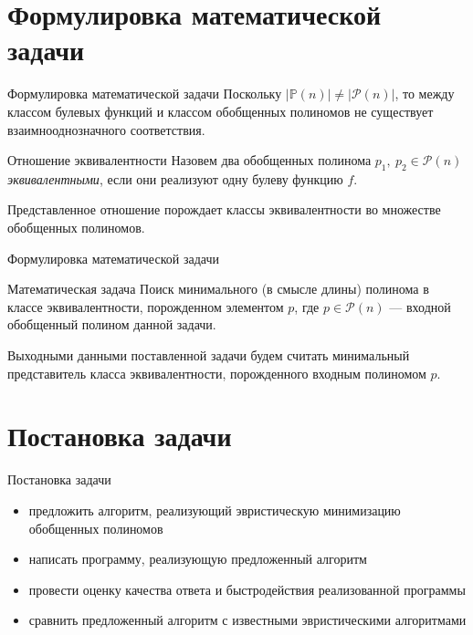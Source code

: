 \documentclass{beamer}
\begin{document}
\section[Математическая задача]{Формулировка математической задачи}
\begin{frame}{Формулировка математической задачи}
Поскольку $ \left| \mathbb{P}(n) \right| \ne \left| \mathcal{P}(n) \right| $, то между классом булевых функций и классом обобщенных полиномов не существует взаимнооднозначного соответствия.

\begin{block}{Отношение эквивалентности}
Назовем два обобщенных полинома $ p_1,\ p_2 \in \mathcal{P}(n) $ \textit{эквивалентными}, если они реализуют одну булеву функцию $ f $.
\end{block}

Представленное отношение порождает классы эквивалентности во множестве обобщенных полиномов.

\end{frame}
\begin{frame}{Формулировка математической задачи}

\begin{block}{Математическая задача}
Поиск минимального (в смысле длины) полинома в классе эквивалентности, порожденном элементом $ p $, где $ p \in \mathcal{P}(n) $ --- входной обобщенный полином данной задачи.

Выходными данными поставленной задачи будем считать минимальный представитель класса эквивалентности, порожденного входным полиномом $ p $.
\end{block}

\end{frame}

\section{Постановка задачи}
\begin{frame}{Постановка задачи}

\begin{itemize}
    \item предложить алгоритм, реализующий эвристическую минимизацию обобщенных полиномов
    \item написать программу, реализующую предложенный алгоритм
    \item провести оценку качества ответа и быстродействия реализованной программы
    \item сравнить предложенный алгоритм с известными эвристическими алгоритмами
\end{itemize}

\end{frame}
\end{document}
